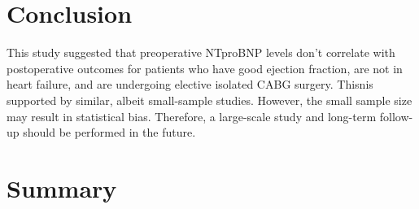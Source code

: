 \documentclass[14pt,a4paper,onecolumn]{extarticle}
\begin{document}
\section{Conclusion}

This study suggested that preoperative NTproBNP levels don't correlate with postoperative outcomes for patients who have good ejection fraction, are not in heart failure, and are undergoing elective isolated CABG surgery. Thisnis supported by similar, albeit small-sample studies.  However, the small sample size may result in statistical bias. Therefore, a large-scale study and long-term follow-up should be performed in the future.


\section{Summary}

\newpage


\end{document}
